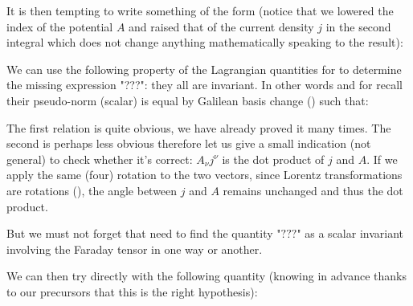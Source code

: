 	It is then tempting to write something of the form (notice that we lowered the index of the potential $A$ and raised that of the current density $j$ in the second integral which does not change anything mathematically speaking to the result):
	
	We can use the following property of the Lagrangian quantities for to determine the missing expression "???": they all are invariant. In other words and for recall their pseudo-norm (scalar) is equal by Galilean basis change () such that:
	
	The first relation is quite obvious, we have already proved it many times. The second is perhaps less obvious therefore let us give a small indication (not general) to check whether it's correct: $A_\nu j^\nu$ is the dot product of $j$ and $A$. If we apply the same (four) rotation to the two vectors, since Lorentz transformations are rotations (), the angle between $j$ and $A$ remains unchanged and thus the dot product.

	But we must not forget that need to find the quantity "$???$" as a scalar invariant involving the Faraday tensor in one way or another.

	We can then try directly with the following quantity (knowing in advance thanks to our precursors that this is the right hypothesis):
	
